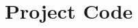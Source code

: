 \documentclass[paper]{aiaaNew}
\begin{document}





\section*{Project Code}
% 

% 

% 

% 
\end{document}
